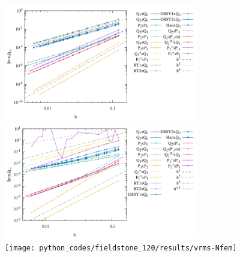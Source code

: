 \begin{center}
\includegraphics[width=8.5cm]{python_codes/fieldstone_120/results/errors-velocity-all}
\includegraphics[width=8.5cm]{python_codes/fieldstone_120/results/errors-pressure-all}\\
\texttt{[image: python\_codes/fieldstone\_120/results/vrms-Nfem]}
\end{center}


